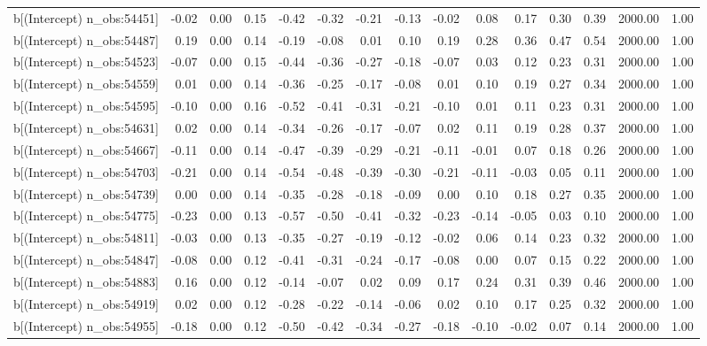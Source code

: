 \begin{table}[ht]
\begin{tabular}{rrrrrrrrrrrrrrr}
  b[(Intercept) n\_obs:54451] & -0.02 & 0.00 & 0.15 & -0.42 & -0.32 & -0.21 & -0.13 & -0.02 & 0.08 & 0.17 & 0.30 & 0.39 & 2000.00 & 1.00 \\ 
  b[(Intercept) n\_obs:54487] & 0.19 & 0.00 & 0.14 & -0.19 & -0.08 & 0.01 & 0.10 & 0.19 & 0.28 & 0.36 & 0.47 & 0.54 & 2000.00 & 1.00 \\ 
  b[(Intercept) n\_obs:54523] & -0.07 & 0.00 & 0.15 & -0.44 & -0.36 & -0.27 & -0.18 & -0.07 & 0.03 & 0.12 & 0.23 & 0.31 & 2000.00 & 1.00 \\ 
  b[(Intercept) n\_obs:54559] & 0.01 & 0.00 & 0.14 & -0.36 & -0.25 & -0.17 & -0.08 & 0.01 & 0.10 & 0.19 & 0.27 & 0.34 & 2000.00 & 1.00 \\ 
  b[(Intercept) n\_obs:54595] & -0.10 & 0.00 & 0.16 & -0.52 & -0.41 & -0.31 & -0.21 & -0.10 & 0.01 & 0.11 & 0.23 & 0.31 & 2000.00 & 1.00 \\ 
  b[(Intercept) n\_obs:54631] & 0.02 & 0.00 & 0.14 & -0.34 & -0.26 & -0.17 & -0.07 & 0.02 & 0.11 & 0.19 & 0.28 & 0.37 & 2000.00 & 1.00 \\ 
  b[(Intercept) n\_obs:54667] & -0.11 & 0.00 & 0.14 & -0.47 & -0.39 & -0.29 & -0.21 & -0.11 & -0.01 & 0.07 & 0.18 & 0.26 & 2000.00 & 1.00 \\ 
  b[(Intercept) n\_obs:54703] & -0.21 & 0.00 & 0.14 & -0.54 & -0.48 & -0.39 & -0.30 & -0.21 & -0.11 & -0.03 & 0.05 & 0.11 & 2000.00 & 1.00 \\ 
  b[(Intercept) n\_obs:54739] & 0.00 & 0.00 & 0.14 & -0.35 & -0.28 & -0.18 & -0.09 & 0.00 & 0.10 & 0.18 & 0.27 & 0.35 & 2000.00 & 1.00 \\ 
  b[(Intercept) n\_obs:54775] & -0.23 & 0.00 & 0.13 & -0.57 & -0.50 & -0.41 & -0.32 & -0.23 & -0.14 & -0.05 & 0.03 & 0.10 & 2000.00 & 1.00 \\ 
  b[(Intercept) n\_obs:54811] & -0.03 & 0.00 & 0.13 & -0.35 & -0.27 & -0.19 & -0.12 & -0.02 & 0.06 & 0.14 & 0.23 & 0.32 & 2000.00 & 1.00 \\ 
  b[(Intercept) n\_obs:54847] & -0.08 & 0.00 & 0.12 & -0.41 & -0.31 & -0.24 & -0.17 & -0.08 & 0.00 & 0.07 & 0.15 & 0.22 & 2000.00 & 1.00 \\ 
  b[(Intercept) n\_obs:54883] & 0.16 & 0.00 & 0.12 & -0.14 & -0.07 & 0.02 & 0.09 & 0.17 & 0.24 & 0.31 & 0.39 & 0.46 & 2000.00 & 1.00 \\ 
  b[(Intercept) n\_obs:54919] & 0.02 & 0.00 & 0.12 & -0.28 & -0.22 & -0.14 & -0.06 & 0.02 & 0.10 & 0.17 & 0.25 & 0.32 & 2000.00 & 1.00 \\ 
  b[(Intercept) n\_obs:54955] & -0.18 & 0.00 & 0.12 & -0.50 & -0.42 & -0.34 & -0.27 & -0.18 & -0.10 & -0.02 & 0.07 & 0.14 & 2000.00 & 1.00 \\ 

\end{tabular}
\end{table}
